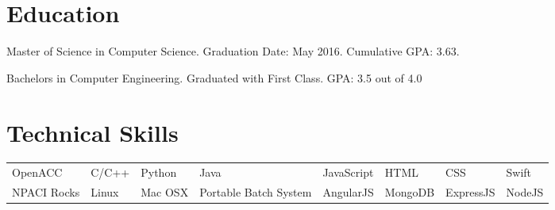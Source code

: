 \documentclass{Mihir_Kavatkar-Resume}
\begin{document}
	
	\section{Education}
		\educationinfoMasters
		{Master of Science in Computer Science.}
		{Graduation Date: May 2016.}
		{Cumulative GPA: 3.63.}
		
		\vspace*{-0.5em}
		\educationinfoBachelors
		{Bachelors in Computer Engineering. Graduated with First Class. GPA: 3.5 out of 4.0}
		
	
	\section{Technical Skills}
		\begin{tabular}{l l l l l l l l}
			OpenACC & C/C++ & Python & Java & JavaScript & HTML & CSS & Swift \\
			NPACI Rocks & Linux & Mac OSX & Portable Batch System & AngularJS & MongoDB &  ExpressJS & NodeJS
		\end{tabular}
	
\end{document}
